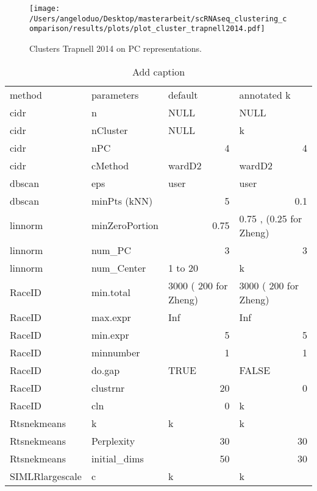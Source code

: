 \documentclass[12pt, a4paper]{article}\usepackage[]{graphicx}\usepackage[]{color}
\begin{document}
\begin{figure}[!h]
\texttt{[image: /Users/angeloduo/Desktop/masterarbeit/scRNAseq\_clustering\_comparison/results/plots/plot\_cluster\_trapnell2014.pdf]}
\caption{ Clusters Trapnell 2014 on PC representations. }
\label{fig:clustertrapnell}
\end{figure}
\begin{table}[htbp]
\centering
\caption{Add caption}
\begin{tabular}{llrr}
method & parameters & \multicolumn{1}{l}{default} & \multicolumn{1}{l}{annotated k} \\
cidr  & n     & \multicolumn{1}{l}{NULL} & \multicolumn{1}{l}{NULL} \\
cidr  & nCluster & \multicolumn{1}{l}{NULL} & \multicolumn{1}{l}{k} \\
cidr  & nPC   & 4     & 4 \\
cidr  & cMethod & \multicolumn{1}{l}{wardD2} & \multicolumn{1}{l}{wardD2} \\
dbscan & eps   & \multicolumn{1}{l}{user} & \multicolumn{1}{l}{user} \\
dbscan & minPts (kNN) & 5     & 0.1 \\
linnorm & minZeroPortion & 0.75  & \multicolumn{1}{l}{0.75 , (0.25 for Zheng)} \\
linnorm & num\_PC & 3     & 3 \\
linnorm & num\_Center & \multicolumn{1}{l}{1 to 20} & \multicolumn{1}{l}{k} \\
RaceID & min.total & \multicolumn{1}{l}{3000 ( 200 for Zheng)} & \multicolumn{1}{l}{3000 ( 200 for Zheng)} \\
RaceID & max.expr & \multicolumn{1}{l}{Inf} & \multicolumn{1}{l}{Inf} \\
RaceID & min.expr & 5     & 5 \\
RaceID & minnumber & 1     & 1 \\
RaceID & do.gap & \multicolumn{1}{l}{TRUE} & \multicolumn{1}{l}{FALSE} \\
RaceID & clustrnr & 20    & 0 \\
RaceID & cln   & 0     & \multicolumn{1}{l}{k} \\
Rtsnekmeans & k     & \multicolumn{1}{l}{k} & \multicolumn{1}{l}{k} \\
Rtsnekmeans & Perplexity & 30    & 30 \\
Rtsnekmeans & initial\_dims & 50    & 30 \\
SIMLRlargescale & c     & \multicolumn{1}{l}{k} & \multicolumn{1}{l}{k} \\

\end{tabular}
\end{table}
\end{document}

